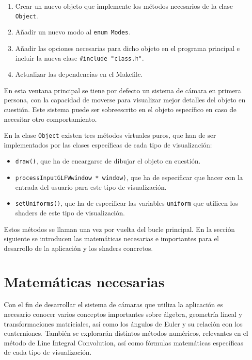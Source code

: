 \begin{enumerate}
		\item Crear un nuevo objeto que implemente los métodos necesarios
				de la clase \verb|Object|.
		\item Añadir un nuevo modo al \verb|enum Modes|.
		\item Añadir las opciones necesarias para dicho objeto en el programa
				principal e incluir la nueva clase \verb|#include "class.h"|.
		\item Actualizar las dependencias en el Makefile.
\end{enumerate}

En esta ventana principal se tiene por defecto un sistema de cámara en primera
persona, con la capacidad de moverse para visualizar mejor detalles del objeto
en cuestión. Este sistema puede ser sobreescrito en el objeto específico en
caso de necesitar otro comportamiento. 

En la clase \verb|Object| existen tres métodos virtuales puros, que han de ser
implementados por las clases específicas de cada tipo de visualización:


\begin{itemize}
		\item \verb|draw()|, que ha de encargarse de dibujar el objeto en
				cuestión.
		\item \verb|processInputGLFWwindow * window)|, que ha de especificar que
				hacer con la entrada del usuario para este tipo de
				visualización.
		\item \verb|setUniforms()|, que ha de especificar las variables
				\verb|uniform| que utilicen los shaders de este tipo de
				visualización.
\end{itemize}

Estos métodos se llaman una vez por vuelta del bucle principal. En la sección
siguiente se introducen las matemáticas necesarias e importantes para el
desarrollo de la aplicación y los shaders concretos.

\section{Matemáticas necesarias}
\label{makereference5.4}

Con el fin de desarrollar el sistema de cámaras que utiliza la aplicación es
necesario conocer varios conceptos importantes sobre álgebra, geometría lineal y
transformaciones matriciales, así como los ángulos de Euler y su relación con
los cuaterniones. También se explorarán distintos métodos numéricos, relevantes
en el método de Line Integral Convolution, así como fórmulas matemáticas
específicas de cada tipo de visualización.

